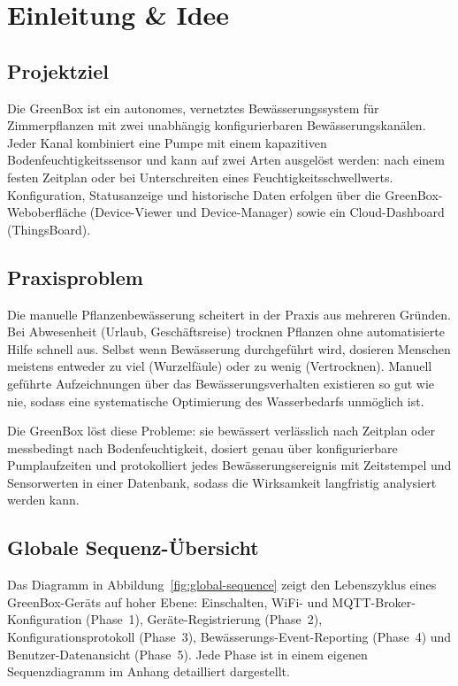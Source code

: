 \documentclass[a4paper,12pt]{article}
\begin{document}
\section{Einleitung \& Idee}

\subsection{Projektziel}

Die GreenBox ist ein autonomes, vernetztes Bewässerungssystem für
Zimmerpflanzen mit zwei unabhängig konfigurierbaren Bewässerungskanälen.
Jeder Kanal kombiniert eine Pumpe mit einem kapazitiven
Bodenfeuchtigkeitssensor und kann auf zwei Arten ausgelöst werden:
nach einem festen Zeitplan oder bei Unterschreiten eines
Feuchtigkeitsschwellwerts. Konfiguration, Statusanzeige und
historische Daten erfolgen über die GreenBox-Weboberfläche
(Device-Viewer und Device-Manager) sowie ein Cloud-Dashboard
(ThingsBoard).

\subsection{Praxisproblem}

Die manuelle Pflanzenbewässerung scheitert in der Praxis aus mehreren
Gründen. Bei Abwesenheit (Urlaub, Geschäftsreise) trocknen Pflanzen
ohne automatisierte Hilfe schnell aus. Selbst wenn Bewässerung
durchgeführt wird, dosieren Menschen meistens entweder zu viel
(Wurzelfäule) oder zu wenig (Vertrocknen). Manuell geführte
Aufzeichnungen über das Bewässerungsverhalten existieren so gut wie
nie, sodass eine systematische Optimierung des Wasserbedarfs unmöglich
ist.

Die GreenBox löst diese Probleme: sie bewässert verlässlich nach
Zeitplan oder messbedingt nach Bodenfeuchtigkeit, dosiert genau über
konfigurierbare Pumplaufzeiten und protokolliert jedes
Bewässerungsereignis mit Zeitstempel und Sensorwerten in einer
Datenbank, sodass die Wirksamkeit langfristig analysiert werden kann.

\subsection{Globale Sequenz-Übersicht}

Das Diagramm in Abbildung~\ref{fig:global-sequence} zeigt den
Lebenszyklus eines GreenBox-Geräts auf hoher Ebene: Einschalten,
WiFi- und MQTT-Broker-Konfiguration (Phase~1), Geräte-Registrierung
(Phase~2), Konfigurationsprotokoll (Phase~3),
Bewässerungs-Event-Reporting (Phase~4) und Benutzer-Datenansicht
(Phase~5). Jede Phase ist in einem eigenen Sequenzdiagramm im Anhang
detailliert dargestellt.
\end{document}
